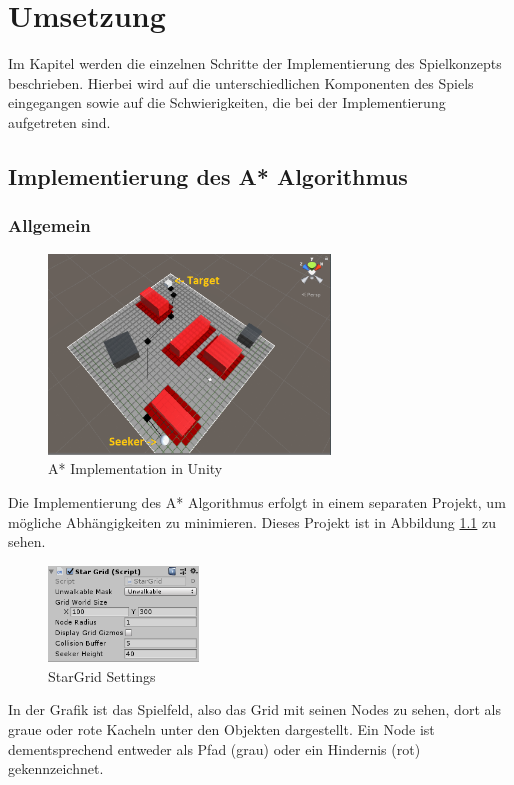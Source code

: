 \chapter{Umsetzung}
\label{sec:Umsetzung}
Im Kapitel  werden die einzelnen Schritte der Implementierung des Spielkonzepts beschrieben. Hierbei wird auf die unterschiedlichen Komponenten des Spiels eingegangen sowie auf die Schwierigkeiten, die bei der Implementierung aufgetreten sind.

\section{Implementierung des A* Algorithmus}
\label{sec:implementAStar}
\subsection*{Allgemein}
\begin{figure}
    \includegraphics[width=7.5cm]{assets/aStarUnityImplementation.png}
    \caption{A* Implementation in Unity}
    \label{fig:aStarImplementationUnity}
\end{figure}
Die Implementierung des A* Algorithmus erfolgt in einem separaten Projekt, um mögliche Abhängigkeiten zu minimieren. Dieses Projekt ist in Abbildung \ref{fig:aStarImplementationUnity} zu sehen.
\begin{figure}
    \includegraphics[width=4cm]{assets/aStarGridSettings}
    \caption{StarGrid Settings}
    \label{fig:aStarGridSettings}
\end{figure}
In der Grafik ist das Spielfeld, also das Grid mit seinen Nodes zu sehen, dort als graue oder rote Kacheln unter den Objekten dargestellt. Ein Node ist dementsprechend entweder als Pfad (grau) oder ein Hindernis (rot) gekennzeichnet.


